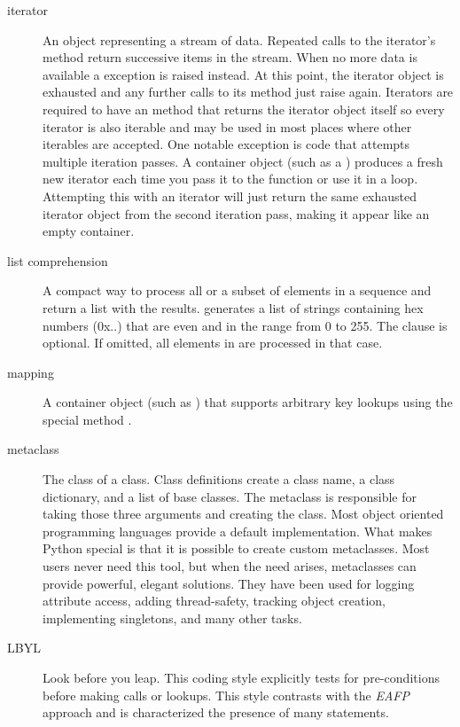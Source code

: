 \begin{description}
\item[iterator]
An object representing a stream of data.  Repeated calls to the
iterator's  method return successive items in the
stream.  When no more data is available a 
exception is raised instead.  At this point, the iterator object is
exhausted and any further calls to its  method just
raise  again.  Iterators are required to have
an  method that returns the iterator object
itself so every iterator is also iterable and may be used in most
places where other iterables are accepted.  One notable exception is
code that attempts multiple iteration passes.  A container object
(such as a ) produces a fresh new iterator each time you
pass it to the  function or use it in a
{} loop.  Attempting this with an iterator will just
return the same exhausted iterator object from the second iteration
pass, making it appear like an empty container.

\item[list comprehension]
A compact way to process all or a subset of elements in a sequence and
return a list with the results.   generates a list of strings
containing hex numbers (0x..) that are even and in the range from 0 to 255.
The  clause is optional.  If omitted, all elements in
{} are processed in that case.

\item[mapping]
A container object (such as ) that supports arbitrary key
lookups using the special method .

\item[metaclass]
The class of a class.  Class definitions create a class name, a class
dictionary, and a list of base classes.  The metaclass is responsible
for taking those three arguments and creating the class.  Most object
oriented programming languages provide a default implementation.  What
makes Python special is that it is possible to create custom
metaclasses.  Most users never need this tool, but when the need
arises, metaclasses can provide powerful, elegant solutions.  They
have been used for logging attribute access, adding thread-safety,
tracking object creation, implementing singletons, and many other
tasks.

\item[LBYL]
Look before you leap.  This coding style explicitly tests for
pre-conditions before making calls or lookups.  This style contrasts
with the \emph{EAFP} approach and is characterized the presence of
many  statements.


\end{description}
